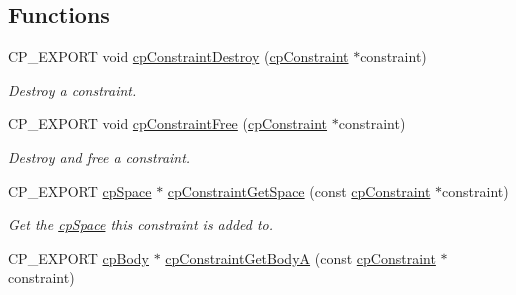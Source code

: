 \subsection*{Functions}
\begin{DoxyCompactItemize}
\item 
\mbox{\label{group__cp_constraint_ga126b8fae3e1ac798ed986112cbdec701}} 
C\+P\+\_\+\+E\+X\+P\+O\+RT void \mbox{\hyperlink{group__cp_constraint_ga126b8fae3e1ac798ed986112cbdec701}{cp\+Constraint\+Destroy}} (\mbox{\hyperlink{structcp_constraint}{cp\+Constraint}} $\ast$constraint)
\begin{DoxyCompactList}\small\item\em Destroy a constraint. \end{DoxyCompactList}\item 
\mbox{\label{group__cp_constraint_ga00928cb83dfaeb0b7eed7d6e635fdffd}} 
C\+P\+\_\+\+E\+X\+P\+O\+RT void \mbox{\hyperlink{group__cp_constraint_ga00928cb83dfaeb0b7eed7d6e635fdffd}{cp\+Constraint\+Free}} (\mbox{\hyperlink{structcp_constraint}{cp\+Constraint}} $\ast$constraint)
\begin{DoxyCompactList}\small\item\em Destroy and free a constraint. \end{DoxyCompactList}\item 
\mbox{\label{group__cp_constraint_ga3931c29e2d1807288fc01fb73a31eb19}} 
C\+P\+\_\+\+E\+X\+P\+O\+RT \mbox{\hyperlink{structcp_space}{cp\+Space}} $\ast$ \mbox{\hyperlink{group__cp_constraint_ga3931c29e2d1807288fc01fb73a31eb19}{cp\+Constraint\+Get\+Space}} (const \mbox{\hyperlink{structcp_constraint}{cp\+Constraint}} $\ast$constraint)
\begin{DoxyCompactList}\small\item\em Get the \mbox{\hyperlink{structcp_space}{cp\+Space}} this constraint is added to. \end{DoxyCompactList}\item 
\mbox{\label{group__cp_constraint_gaaaee19a1453191b8555eca1ea0478f90}} 
C\+P\+\_\+\+E\+X\+P\+O\+RT \mbox{\hyperlink{structcp_body}{cp\+Body}} $\ast$ \mbox{\hyperlink{group__cp_constraint_gaaaee19a1453191b8555eca1ea0478f90}{cp\+Constraint\+Get\+BodyA}} (const \mbox{\hyperlink{structcp_constraint}{cp\+Constraint}} $\ast$constraint)

\end{DoxyCompactItemize}
